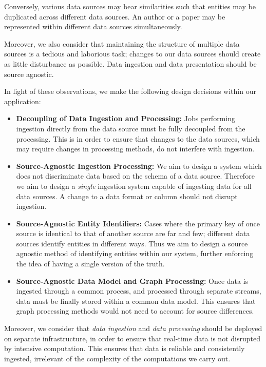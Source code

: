 \documentclass[10pt,journal,final,a4paper]{IEEEtran}
\begin{document}
Conversely, various data sources may bear similarities such that entities may be duplicated across different data sources. An author or a paper may be represented within different data sources simultaneously. 

Moreover, we also consider that maintaining the structure of multiple data sources is a tedious and laborious task; changes to our data sources should create as little disturbance as possible. Data ingestion and data presentation should be source agnostic.

In light of these observations, we make the following design decisions within our application:
\begin{itemize}
\item \textbf{Decoupling of Data Ingestion and Processing:} Jobs performing ingestion directly from the data source must be fully decoupled from the processing. This is in order to ensure that changes to the data sources, which may require changes in processing methods, do not interfere with ingestion.
\item \textbf{Source-Agnostic Ingestion Processing:} We aim to design a system which does not discriminate data based on the schema of a data source. Therefore we aim to design a \textit{single} ingestion system capable of ingesting data for all data sources. A change to a data format or column should not disrupt ingestion.
\item \textbf{Source-Agnostic Entity Identifiers:} Cases where the primary key of once source is identical to that of another source are far and few; different data sources identify entities in different ways. Thus we aim to design a source agnostic method of identifying entities within our system, further enforcing the idea of having a single version of the truth.
\item \textbf{Source-Agnostic Data Model and Graph Processing:} Once data is ingested through a common process, and processed through separate streams, data must be finally stored within a common data model. This ensures that graph processing methods would not need to account for source differences.
\end{itemize}


Moreover, we consider that \textit{data ingestion} and \textit{data processing} should be deployed on separate infrastructure, in order to ensure that real-time data is not disrupted by intensive computation. This ensures that data is reliable and consistently ingested, irrelevant of the complexity of the computations we carry out.
\end{document}
